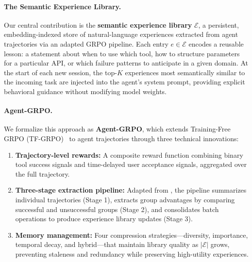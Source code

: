 \paragraph{The Semantic Experience Library.}
Our central contribution is the \textbf{semantic experience library}
$\mathcal{E}$, a persistent, embedding-indexed store of natural-language
experiences extracted from agent trajectories via an adapted GRPO pipeline.
Each entry $e \in \mathcal{E}$ encodes a reusable lesson: a statement about
when to use which tool, how to structure parameters for a particular API, or
which failure patterns to anticipate in a given domain. At the start of each
new session, the top-$K$ experiences most semantically similar to the incoming
task are injected into the agent's system prompt, providing explicit behavioral
guidance without modifying model weights.

\paragraph{Agent-GRPO.}
We formalize this approach as \textbf{Agent-GRPO}, which extends
Training-Free GRPO (TF-GRPO)~\cite{hanzo2026aso} to agent trajectories through
three technical innovations:

\begin{enumerate}[leftmargin=1.5em]
    \item \textbf{Trajectory-level rewards:} A composite reward function
          combining binary tool success signals and time-delayed user acceptance
          signals, aggregated over the full trajectory.
    \item \textbf{Three-stage extraction pipeline:} Adapted from
          \cite{tencent2025youtoagent}, the pipeline summarizes individual
          trajectories (Stage 1), extracts group advantages by comparing
          successful and unsuccessful groups (Stage 2), and consolidates batch
          operations to produce experience library updates (Stage 3).
    \item \textbf{Memory management:} Four compression strategies---diversity,
          importance, temporal decay, and hybrid---that maintain library quality
          as $|\mathcal{E}|$ grows, preventing staleness and redundancy while
          preserving high-utility experiences.
\end{enumerate}

